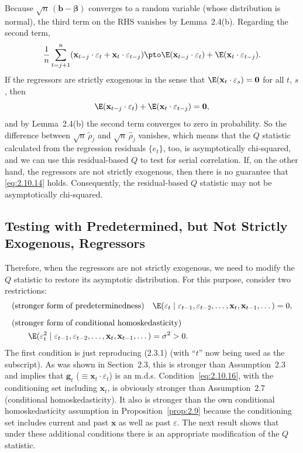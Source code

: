 %
Because $\sqrt{n}\,(\mathbf{b} - \bm{\beta})$ converges to a random variable (whose distribution is
normal), the third term on the RHS vanishes by Lemma~2.4(b). Regarding the second term,
%
\begin{equation}
\frac{1}{n}\sum_{t=j+1}^{n}
(\mathbf{x}_{t-j}\cdot\varepsilon_t + \mathbf{x}_t\cdot\varepsilon_{t-j})
\pto \E(\mathbf{x}_{t-j}\cdot\varepsilon_t) + \E(\mathbf{x}_t\cdot\varepsilon_{t-j}).
\label{eq:2.10.13}
\end{equation}
%
If the regressors are strictly exogenous in the sense that
$\E(\mathbf{x}_t \cdot \varepsilon_s) = \mathbf{0}$ for all $t$, $s$, then
%
\begin{equation}
\E(\mathbf{x}_{t-j}\cdot\varepsilon_t) + \E(\mathbf{x}_t\cdot\varepsilon_{t-j}) = \mathbf{0},
\label{eq:2.10.14}
\end{equation}
%
and by Lemma~2.4(b) the second term converges to zero in probability. So the
difference between $\sqrt{n}\,\tilde{\rho}_j$ and $\sqrt{n}\,\hat{\rho}_j$ vanishes,
which means that the $Q$ statistic calculated from the regression residuals $\{e_t\}$,
too, is asymptotically chi-squared, and we can use this residual-based $Q$ to test for
serial correlation. If, on the other hand, the regressors are not strictly exogenous,
then there is no guarantee that \eqref{eq:2.10.14} holds. Consequently, the residual-based
$Q$ statistic may not be asymptotically chi-squared.

\subsection*{Testing with Predetermined, but Not Strictly Exogenous, Regressors}

Therefore, when the regressors are not strictly exogenous, we need to modify the
$Q$ statistic to restore its asymptotic distribution. For this purpose, consider two
restrictions:
%
\begin{align}
&\text{(stronger form of predeterminedness)}\quad
\E(\varepsilon_t \mid \varepsilon_{t-1}, \varepsilon_{t-2}, \ldots,
\mathbf{x}_t, \mathbf{x}_{t-1}, \ldots\,) = 0,
\label{eq:2.10.15} \\[6pt]
&\text{(stronger form of conditional homoskedasticity)} \notag \\
&\qquad \E(\varepsilon_t^2 \mid \varepsilon_{t-1}, \varepsilon_{t-2}, \ldots,
\mathbf{x}_t, \mathbf{x}_{t-1}, \ldots\,) = \sigma^2 > 0.
\label{eq:2.10.16}
\end{align}
%
The first condition is just reproducing (2.3.1) (with ``$t$'' now being used as the
subscript). As was shown in Section~2.3, this is stronger than Assumption~2.3 and
implies that $\mathbf{g}_t$ ($\equiv \mathbf{x}_t \cdot \varepsilon_t$) is an m.d.s. Condition~\eqref{eq:2.10.16}, with the conditioning
set including $\mathbf{x}_t$, is obviously stronger than Assumption~2.7 (conditional homoskedasticity). It also is stronger than the own conditional homoskedasticity assumption
in Proposition~\ref{prop:2.9} because the conditioning set includes current and past $\mathbf{x}$ as well
as past $\varepsilon$. The next result shows that under these additional conditions there is an
appropriate modification of the $Q$ statistic.

